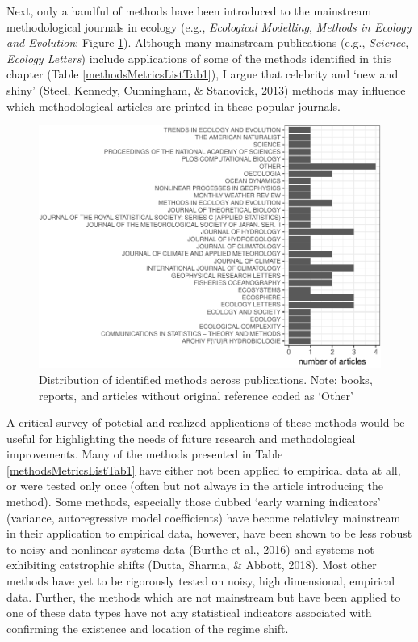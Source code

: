 \documentclass[12pt,twoside,openany]{reedthesis}
\begin{document}
Next, only a handful of methods have been introduced to the mainstream methodological journals in ecology (e.g., \emph{Ecological Modelling}, \emph{Methods in Ecology and Evolution}; Figure \ref{fig:jrnlDistFig}). Although many mainstream publications (e.g., \emph{Science}, \emph{Ecology Letters}) include applications of some of the methods identified in this chapter (Table \ref{methodsMetricsListTab1}), I argue that celebrity and `new and shiny' (Steel, Kennedy, Cunningham, \& Stanovick, 2013) methods may influence which methodological articles are printed in these popular journals.
\begin{figure}
\centering
\includegraphics{_myDissertation_files/figure-latex/jrnlDistFig-1.pdf}
\caption{\label{fig:jrnlDistFig}Distribution of identified methods across publications. Note: books, reports, and articles without original reference coded as `Other'}
\end{figure}
A critical survey of potetial and realized applications of these methods would be useful for highlighting the needs of future research and methodological improvements. Many of the methods presented in Table \ref{methodsMetricsListTab1} have either not been applied to empirical data at all, or were tested only once (often but not always in the article introducing the method). Some methods, especially those dubbed `early warning indicators' (variance, autoregressive model coefficients) have become relativley mainstream in their application to empirical data, however, have been shown to be less robust to noisy and nonlinear systems data (Burthe et al., 2016) and systems not exhibiting catstrophic shifts (Dutta, Sharma, \& Abbott, 2018). Most other methods have yet to be rigorously tested on noisy, high dimensional, empirical data. Further, the methods which are not mainstream but have been applied to one of these data types have not any statistical indicators associated with confirming the existence and location of the regime shift.
\end{document}
